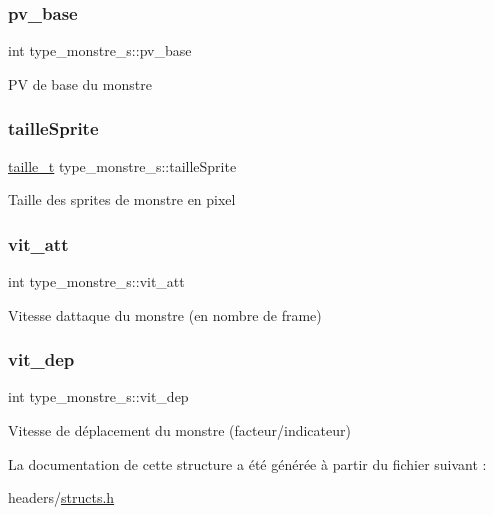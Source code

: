 \subsubsection{\texorpdfstring{pv\+\_\+base}{pv\_base}}
{\footnotesize\ttfamily int type\+\_\+monstre\+\_\+s\+::pv\+\_\+base}

PV de base du monstre \mbox{\label{structtype__monstre__s_a2b2b4110520736e30d3a4853a9876469}} 
\subsubsection{\texorpdfstring{taille\+Sprite}{tailleSprite}}
{\footnotesize\ttfamily \hyperlink{structtaille__s}{taille\+\_\+t} type\+\_\+monstre\+\_\+s\+::taille\+Sprite}

Taille des sprites de monstre en pixel \mbox{\label{structtype__monstre__s_a5bb66d5b722fc97f901c5eaf7d621fd4}} 
\subsubsection{\texorpdfstring{vit\+\_\+att}{vit\_att}}
{\footnotesize\ttfamily int type\+\_\+monstre\+\_\+s\+::vit\+\_\+att}

Vitesse d\textquotesingle{}attaque du monstre (en nombre de frame) \mbox{\label{structtype__monstre__s_a768470695da3d9377f1e7e97a3c45ed7}} 
\subsubsection{\texorpdfstring{vit\+\_\+dep}{vit\_dep}}
{\footnotesize\ttfamily int type\+\_\+monstre\+\_\+s\+::vit\+\_\+dep}

Vitesse de déplacement du monstre (facteur/indicateur) 

La documentation de cette structure a été générée à partir du fichier suivant \+:\begin{DoxyCompactItemize}
\item 
headers/\hyperlink{structs_8h}{structs.\+h}\end{DoxyCompactItemize}
